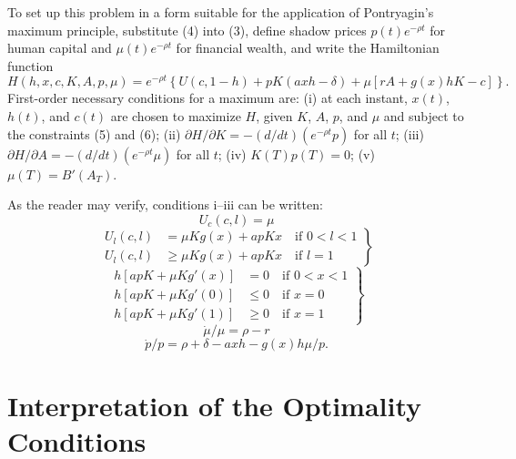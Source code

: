 \documentclass[11pt,fleqn]{article}
\begin{document}
To set up this problem in a form suitable for the application of Pontryagin's maximum principle, substitute (4) into (3), define shadow prices $p(t)e^{-\rho t}$ for human capital and $\mu(t)e^{-\rho t}$ for financial wealth, and write the Hamiltonian function
\[
H(h, x, c, K, A, p, \mu) = e^{-\rho t} \left\{ U(c, 1 - h) + p K (axh - \delta) + \mu [rA + g(x)hK - c] \right\}.
\]
First-order necessary conditions for a maximum are: (i) at each instant, $x(t)$, $h(t)$, and $c(t)$ are chosen to maximize $H$, given $K$, $A$, $p$, and $\mu$ and subject to the constraints (5) and (6); (ii) $\partial H/\partial K = - (d/dt)(e^{-\rho t}p)$ for all $t$; (iii) $\partial H/\partial A = - (d/dt)(e^{-\rho t}\mu)$ for all $t$; (iv) $K(T)p(T) = 0$; (v) $\mu(T) = B'(A_T)$.

As the reader may verify, conditions i--iii can be written:
\begin{equation}
U_c(c, l) = \mu
\end{equation}
\begin{equation}
\left.
\begin{aligned}
U_l(c, l) &= \mu K g(x) + a p K x \quad \text{if } 0 < l < 1 \\
U_l(c, l) &\geq \mu K g(x) + a p K x \quad \text{if } l = 1
\end{aligned}
\right\}
\end{equation}
\begin{equation}
\left.
\begin{aligned}
h[a p K + \mu K g'(x)] &= 0 \quad \text{if } 0 < x < 1 \\
h[a p K + \mu K g'(0)] &\leq 0 \quad \text{if } x = 0 \\
h[a p K + \mu K g'(1)] &\geq 0 \quad \text{if } x = 1
\end{aligned}
\right\}
\end{equation}
\begin{equation}
\dot{\mu}/\mu = \rho - r
\end{equation}
\begin{equation}
\dot{p}/p = \rho + \delta - axh - g(x)h\mu/p.
\end{equation}

\section{Interpretation of the Optimality Conditions}
\end{document}
